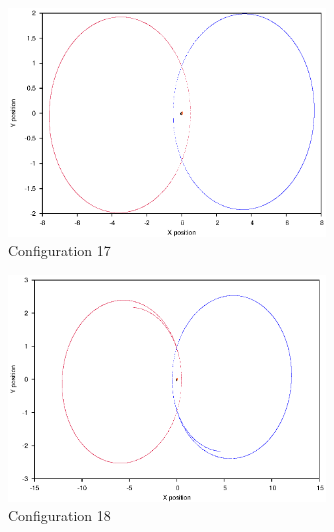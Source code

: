 \documentclass[a4paper,12pt]{article}
\begin{document}
\begin{figure}[H]
\centering
\includegraphics[width=0.75\textwidth]{./results/07-1-07-15/Orbit.eps}
\caption{Configuration 17}
\label{fig:config17}
\end{figure}
\begin{figure}[H]
\centering
\includegraphics[width=0.75\textwidth]{./results/08-105-08-12/Orbit.eps}
\caption{Configuration 18}
\label{fig:config18}
\end{figure}
\end{document}
